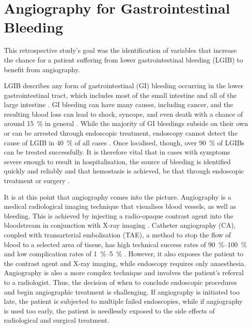 
\chapter{Angiography for Gastrointestinal Bleeding}

This retrospective study's goal was the identification of variables that
increase the chance for a patient suffering from lower gastrointestinal
bleeding (LGIB) to benefit from angiography.

LGIB describes any form of gastrointestinal (GI) bleeding occurring in the
lower gastrointestinal tract, which includes most of the small intestine and
all of the large intestine \citep{Treuting2018}. GI bleeding can have many
causes, including cancer, and the resulting blood loss can lead to shock,
syncope, and even death with a chance of around \SI{15}{\percent} in general
\citep{Rockey2005,PrasadKerlin2013,Wang2013,Kim2014}. While the majority of GI
bleedings subside on their own or can be arrested through endoscopic
treatment, endoscopy cannot detect the cause of LGIB in \SI{40}{\percent} of
all cases \citep{Yamada2015,Werner2018}. Once localised, though, over
\SI{90}{\percent} of LGIBs can be treated successfully. It is therefore vital
that in cases with symptoms severe enough to result in hospitalisation, the
source of bleeding is identified quickly and reliably and that hemostasis is
achieved, be that through endoscopic treatment or surgery \citep{Strate2010,
Werner2018}.

It is at this point that angiography comes into the picture. Angiography is a
medical radiological imaging technique that visualises blood vessels, as well
as bleeding. This is achieved by injecting a radio-opaque contrast agent into
the bloodstream in conjunction with X-ray imaging \citep{Martin2015}. Catheter
angiography (CA), coupled with transarterial embolisation (TAE), a method to
stop the flow of blood to a selected area of tissue, has high technical
success rates of \SIrange{90}{100}{\percent} and low complication rates of
\SIrange{1}{5}{\percent} \citep{Tan2008,Evangelista2000,Strate2010,Kim2017,
Lee2018,Oakland2019,Pannatier2019}. However, it also exposes the patient to
the  contrast agent and X-ray imaging, while endoscopy requires only
anaesthesia. Angiography is also a more complex technique and involves the
patient's referral to a radiologist. Thus, the decision of when to conclude
endoscopic procedures and begin angiographic treatment is challenging. If
angiography is initiated too late, the patient is subjected to multiple
failed endoscopies, while if angiography is used too early, the patient is
needlessly exposed to the side effects of radiological and surgical treatment.

